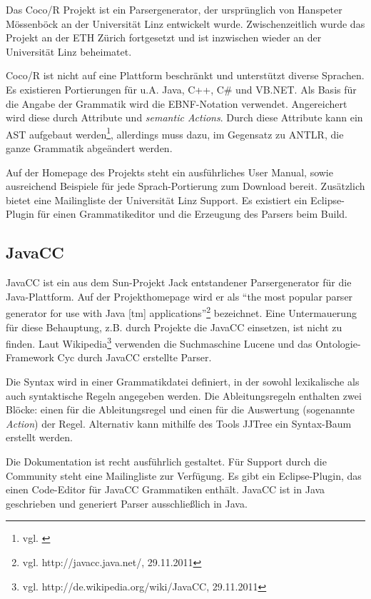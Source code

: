 Das Coco/R Projekt\cite{HaMo90} ist ein Parsergenerator, der ursprünglich von Hans\-peter Mössenböck an der Universität Linz entwickelt wurde. Zwischenzeitlich wurde das Projekt an der ETH Zürich fortgesetzt und ist inzwischen wieder an der Universität Linz beheimatet.

Coco/R ist nicht auf eine Plattform beschränkt und unterstützt diverse Spra\-chen. Es existieren Portierungen für u.A. Java, C++, C\# und VB.NET. Als Basis für die Angabe der Grammatik wird die EBNF-Notation verwendet. Angereichert wird diese durch Attribute und \emph{semantic Actions}. Durch diese Attribute kann ein AST aufgebaut werden\footnote{vgl. \cite{Moes11}}, allerdings muss dazu, im Gegensatz zu ANTLR, die ganze Grammatik abgeändert werden.

Auf der Homepage des Projekts steht ein ausführliches User Manual, sowie ausreichend Beispiele für jede Sprach-Portierung zum Download bereit. Zu\-sätz\-lich bietet eine Mailingliste der Universität Linz Support. Es existiert ein Eclipse-Plugin für einen Grammatikeditor und die Erzeugung des Parsers beim Build.

\subsection{JavaCC}


JavaCC ist ein aus dem Sun-Projekt Jack entstandener Parsergenerator für die Java-Plattform. Auf der Projekthomepage wird er als ``the most popular parser generator for use with Java [tm] applications''\footnote{vgl. http://javacc.java.net/, 29.11.2011} bezeichnet. Eine Untermauerung für diese Behauptung, z.B. durch Projekte die JavaCC einsetzen, ist nicht zu finden. Laut Wikipedia\footnote{vgl. http://de.wikipedia.org/wiki/JavaCC, 29.11.2011} verwenden die Suchmaschine Lucene und das Ontologie-Framework Cyc durch JavaCC erstellte Parser.

Die Syntax wird in einer Grammatikdatei definiert, in der sowohl lexikalische als auch syntaktische Regeln angegeben werden. Die Ab\-lei\-tungs\-re\-geln enthalten zwei Blöcke: einen für die Ab\-lei\-tungs\-re\-gel und einen für die Auswertung (sogenannte \emph{Action}) der Regel. Alternativ kann mithilfe des Tools JJTree ein Syntax-Baum erstellt werden.

Die Dokumentation ist recht ausführlich gestaltet. Für Support durch die Community steht eine Mailingliste zur Verfügung. Es gibt ein Eclipse-Plugin, das einen Code-Editor für JavaCC Grammatiken enthält. JavaCC ist in Java geschrieben und generiert Parser ausschließlich in Java.





